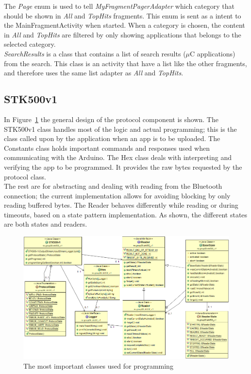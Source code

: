 	The \textit{Page} enum is used to tell \textit{MyFragmentPagerAdapter} which category that should be shown in \textit{All} and \textit{TopHits} fragments. This enum is sent as a intent to the MainFragmentActivity when started. When a category is chosen, the content in \textit{All} and \textit{TopHits} are filtered by only showing applications that belongs to the selected category.\\

	\textit{SearchResults} is a class that contains a list of search results ($\mu$C applications) from the search. This class is an activity that have a list like the other fragments, and therefore uses the same list adapter as \textit{All} and \textit{TopHits}. 

	\subsection{STK500v1}
	In Figure~\ref{fig:stk500v1uml} the general design of the protocol component is shown. The STK500v1 class
    handles most of the logic and actual programming; this is the class called upon by the application when
    an app is to be uploaded. The Constants class holds important commands and responses used when communicating
    with the Arduino.
    The Hex class deals with interpreting and verifying the app to be programmed. It provides the raw bytes
    requested by the protocol class.\\
    
    The rest are for abstracting and dealing with reading from the Bluetooth connection; the current
    implementation allows for avoiding blocking by only reading buffered bytes. The Reader behaves differently while
    reading or during timeouts, based on a state pattern implementation. As shown, the different states are both
    states and readers.

	\begin{figure}[H]
	\hspace*{-1.0in}
	\includegraphics[scale=0.5]{images/UML/stk500v1.png}
	\caption[UML - Main GUI]{The most important classes used for programming}
	\label{fig:stk500v1uml}
	\end{figure}

